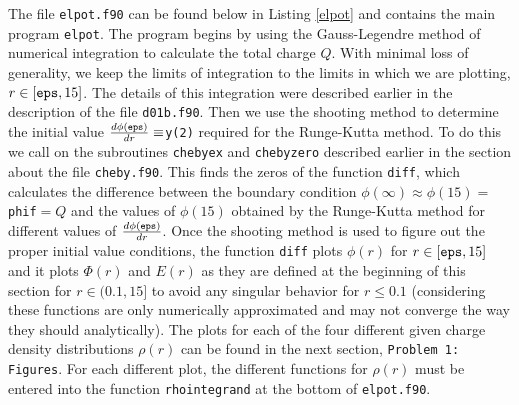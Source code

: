 \documentclass[12pt]{article}
\begin{document}
The file {\tt elpot.f90} can be found below in Listing \ref{elpot} and contains the main program {\tt elpot}.  The program begins by using the Gauss-Legendre method of numerical integration to calculate the total charge $Q$.  With minimal loss of generality, we keep the limits of integration to the limits in which we are plotting, $r\in[{\tt eps},15]$.  The details of this integration were described earlier in the description of the file {\tt d01b.f90}.  Then we use the shooting method to determine the initial value $\frac{d\phi({\tt eps})}{dr}\equiv${\tt y(2)} required for the Runge-Kutta method.  To do this we call on the subroutines {\tt chebyex} and {\tt chebyzero} described earlier in the section about the file {\tt cheby.f90}.  This finds the zeros of the function {\tt diff}, which calculates the difference between the boundary condition $\phi(\infty)\approx\phi(15)=${\tt phif}$=Q$ and the values of $\phi(15)$ obtained by the Runge-Kutta method for different values of $\frac{d\phi({\tt eps})}{dr}$.  Once the shooting method is used to figure out the proper initial value conditions, the function {\tt diff} plots $\phi(r)$ for $r \in [{\tt eps}, 15]$ and it plots $\Phi(r)$ and $E(r)$ as they are defined at the beginning of this section for $r\in(0.1,15]$ to avoid any singular behavior for $r\leq 0.1$ (considering these functions are only numerically approximated and may not converge the way they should analytically).  The plots for each of the four different given charge density distributions $\rho(r)$ can be found in the next section, {\tt Problem 1: Figures}.  For each different plot, the different functions for $\rho(r)$ must be entered into the function {\tt rhointegrand} at the bottom of {\tt elpot.f90}.
\end{document}
